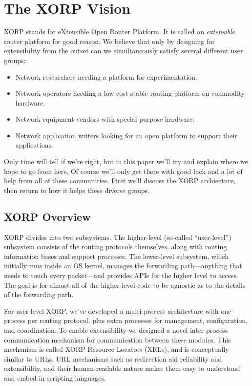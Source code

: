 \section{The XORP Vision}

XORP stands for eXtensible Open Router Platform.  It is called an {\it
extensible} router platform for good reason.  We believe that only by
designing for extensibility from the outset can we simultaneously
satisfy several different user groups:
\begin{itemize}
\vspace{-0.07in}
\item Network researchers needing a platform for experimentation.
\vspace{-0.07in}
\item Network operators needing a low-cost stable routing platform on
commodity hardware.
\vspace{-0.07in}
\item Network equipment vendors with special purpose hardware.
\vspace{-0.07in}
\item Network application writers looking for an open platform to
support their applications.
\end{itemize}
\vspace{-0.05in}
Only time will tell if we're right, but in this paper we'll try and
explain where we hope to go from here.  Of course we'll only get there
with good luck and a lot of help from all of these communities.  First
we'll discuss the XORP archiecture, then return to how it helps these
diverse groups.

\subsection{XORP Overview}

XORP divides into two subsystems. 
The higher-level (so-called ``user-level'') subsystem
consists of the routing protocols themselves, along with routing
information bases
and support processes. 
The lower-level subsystem, which initially runs inside an OS kernel, manages the
forwarding path---anything that needs to touch every packet---and provides
APIs for the higher level to access.
The goal is for almost all of
the higher-level code to be agnostic as to the details of the
forwarding path.

For user-level XORP, we've developed a multi-process architecture with
one process per routing protocol, plus extra processes for management,
configuration, and coordination.  To enable extensibility we designed
a novel inter-process communication mechanism for communication
between these modules.  This mechanism is called XORP Resource
Locators (XRLs), and is conceptually similar to URLs.  URL mechanisms
such as redirection aid reliability and extensibility, and their
human-readable nature makes them easy to understand and embed in
scripting languages.


